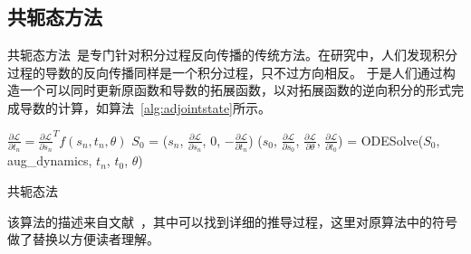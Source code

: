\documentclass[A4,twoside,fontset=ubuntu,UTF8]{ctexart}
\begin{document}
\subsection{共轭态方法}
    共轭态方法~\cite{Plessix2006,Chen2018}是专门针对积分过程反向传播的传统方法。在研究中，人们发现积分过程的导数的反向传播同样是一个积分过程，只不过方向相反。
    于是人们通过构造一个可以同时更新原函数和导数的拓展函数，以对拓展函数的逆向积分的形式完成导数的计算，如算法~\ref{alg:adjointstate}所示。
\begin{algorithm}
    \SetAlgoLined
    \DontPrintSemicolon
        $\frac{\partial \mathcal{L}}{\partial t_n} = \frac{\partial \mathcal{L}}{\partial s_n}^Tf(s_n,t_n,\theta)$ 
        $S_0$ = ($s_n$, $\frac{\partial \mathcal{L}}{\partial s_n}$, $0$, $-\frac{\partial \mathcal{L}}{\partial t_n}$) 
        ($s_0$, $\frac{\partial \mathcal{L}}{\partial s_0}$, $\frac{\partial \mathcal{L}}{\partial \theta}$, $\frac{\partial \mathcal{L}}{\partial t_0}$) = ODESolve($S_0$, aug\_dynamics, $t_n$, $t_0$, $\theta$) 
    \caption{共轭态法}\label{alg:adjointstate}
\end{algorithm}

该算法的描述来自文献~\cite{Chen2018}，其中可以找到详细的推导过程，这里对原算法中的符号做了替换以方便读者理解。
\end{document}
